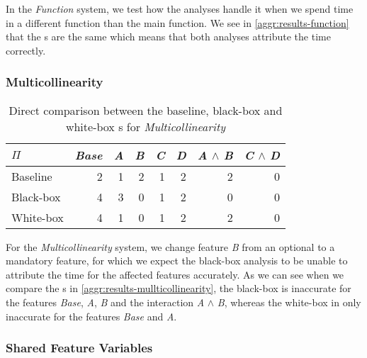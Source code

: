 In the \emph{Function} system, we test how the analyses handle it when we spend time in a different function than the main function. 
We see in \autoref{aggr:results-function} that the {\perfInfluenceModel}s are the same which means 
that both analyses attribute the time correctly.

\subsubsection*{Multicollinearity}

\begin{table}[H]
    \centering
    \begin{tabular}{lrrrrrrr}
    \toprule
    $\Pi$    & \emph{Base} & \emph{A} & \emph{B} & \emph{C} & \emph{D} & \emph{A} $\land$ \emph{B} & \emph{C} $\land$ \emph{D}  \\ \midrule
    Baseline & 2    & 1 & 2 & 1 & 2 & 2           & 0            \\
    Black-box & 4   & 3 & 0 & 1 & 2 & 0           & 0            \\
    White-box &   4 &  1 &  0 &  1 &  2 &     2 &     0 \\ \bottomrule
    \end{tabular}  
    \caption{Direct comparison between the baseline, black-box and white-box {\perfInfluenceModel}s for \emph{Multicollinearity}}
    \label{aggr:results-mullticollinearity}
\end{table}

For the \emph{Multicollinearity} system, we change feature \emph{B} from an optional to a mandatory feature, 
for which we expect the black-box analysis to be unable to attribute the time for the affected features accurately.
As we can see when we compare the {\perfInfluenceModel}s in \autoref{aggr:results-mullticollinearity}, 
the black-box is inaccurate for the features \emph{Base}, \emph{A}, \emph{B} and 
the interaction \emph{A} $\land$ \emph{B}, whereas the white-box in only inaccurate for the features \emph{Base} and \emph{A}.

\subsubsection*{Shared Feature Variables}

